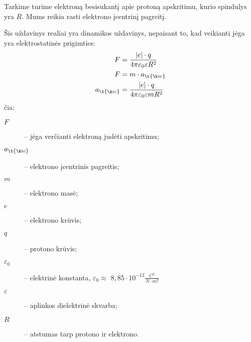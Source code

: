 \begin{exmp}
  Tarkime turime elektroną besisukantį apie protoną apskritimu, kurio
  spindulys yra $R$. Mums reikia rasti elektrono 
  įcentrinį pagreitį.

  Šis uždavinys realiai yra dinamikos uždavinys, nepaisant to, kad
  veikianti jėga yra elektrostatinės prigimties:
  \begin{align*}
    F &= \frac{|e| \cdot q}{4 \pi \varepsilon_{0} \varepsilon R^{2}} \\
    F &= m \cdot a_{\t{įc}} \\
    a_{\t{įc}}
    &= \frac{|e| \cdot q}{4 \pi \varepsilon_{0} \varepsilon m R^{2}} \\
  \end{align*}
  čia:
  \begin{description}
    \item[$F$] – jėga verčianti elektroną judėti apskritimu;
    \item[$a_{\t{įc}}$] – elektrono įcentrinis pagreitis;
    \item[$m$] – elektrono masė;
    \item[$e$] – elektrono krūvis;
    \item[$q$] – protono krūvis;
    \item[$\varepsilon_{0}$] – elektrinė konstanta,
      $\varepsilon_{0} \approx $
      $8,85 \cdot 10^{-12} \frac{C^{2}}{N \cdot m^{2}}$
    \item[$\varepsilon$] – aplinkos dielektrinė skvarba;
    \item[$R$] – atstumas tarp protono ir elektrono.
  \end{description}
\end{exmp}
